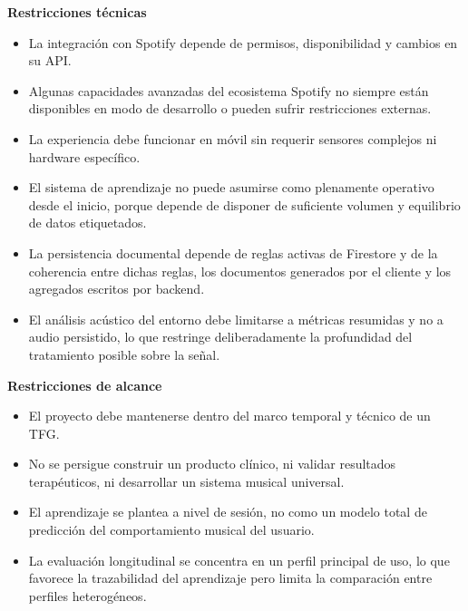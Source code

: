 \textbf{Restricciones técnicas}
\begin{itemize}
    \item La integración con Spotify depende de permisos, disponibilidad y cambios en su API.
    \item Algunas capacidades avanzadas del ecosistema Spotify no siempre están disponibles en modo de desarrollo o pueden sufrir restricciones externas.
    \item La experiencia debe funcionar en móvil sin requerir sensores complejos ni hardware específico.
    \item El sistema de aprendizaje no puede asumirse como plenamente operativo desde el inicio, porque depende de disponer de suficiente volumen y equilibrio de datos etiquetados.
    \item La persistencia documental depende de reglas activas de Firestore y de la coherencia entre dichas reglas, los documentos generados por el cliente y los agregados escritos por backend.
    \item El análisis acústico del entorno debe limitarse a métricas resumidas y no a audio persistido, lo que restringe deliberadamente la profundidad del tratamiento posible sobre la señal.
\end{itemize}

\textbf{Restricciones de alcance}
\begin{itemize}
    \item El proyecto debe mantenerse dentro del marco temporal y técnico de un TFG.
    \item No se persigue construir un producto clínico, ni validar resultados terapéuticos, ni desarrollar un sistema musical universal.
    \item El aprendizaje se plantea a nivel de sesión, no como un modelo total de predicción del comportamiento musical del usuario.
    \item La evaluación longitudinal se concentra en un perfil principal de uso, lo que favorece la trazabilidad del aprendizaje pero limita la comparación entre perfiles heterogéneos.
\end{itemize}

